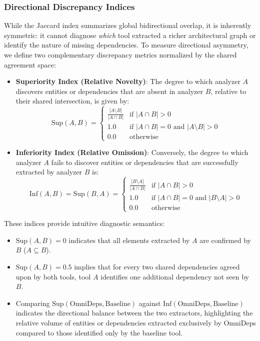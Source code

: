 \subsubsection{Directional Discrepancy Indices}
\label{subsec:discrepancy_indices}

While the Jaccard index summarizes global bidirectional overlap, it
is inherently symmetric: it cannot diagnose \textit{which} tool
extracted a richer architectural graph or identify the nature of
missing dependencies. To measure directional asymmetry, we define two
complementary discrepancy metrics normalized by the shared agreement space:

\begin{itemize}
  \item \textbf{Superiority Index (Relative Novelty)}:
    The degree to which analyzer $A$ discovers entities or dependencies
    that are absent in analyzer $B$, relative to their shared
    intersection, is given by:
    \begin{equation}
      \text{Sup}(A, B) =
      \begin{cases}
        \frac{|A \setminus B|}{|A \cap B|} & \text{if } |A \cap B| > 0 \\
        1.0 & \text{if } |A \cap B| = 0 \text{ and } |A \setminus B| > 0 \\
        0.0 & \text{otherwise}
      \end{cases}
    \end{equation}
  \item \textbf{Inferiority Index (Relative Omission)}:
    Conversely, the degree to which analyzer $A$ fails to discover
    entities or dependencies that are successfully extracted by analyzer $B$ is:
    \begin{equation}
      \text{Inf}(A, B) = \text{Sup}(B, A) =
      \begin{cases}
        \frac{|B \setminus A|}{|A \cap B|} & \text{if } |A \cap B| > 0 \\
        1.0 & \text{if } |A \cap B| = 0 \text{ and } |B \setminus A| > 0 \\
        0.0 & \text{otherwise}
      \end{cases}
    \end{equation}
\end{itemize}

\noindent
These indices provide intuitive diagnostic semantics:
\begin{itemize}
  \item $\text{Sup}(A, B) = 0$ indicates that all elements extracted
    by $A$ are confirmed by $B$ ($A \subseteq B$).
  \item $\text{Sup}(A, B) = 0.5$ implies that for every two shared
    dependencies agreed upon by both tools, tool $A$ identifies one
    additional dependency not seen by $B$.
  \item Comparing $\text{Sup}(\text{OmniDeps}, \text{Baseline})$
    against $\text{Inf}(\text{OmniDeps}, \text{Baseline})$
    indicates the directional balance between the two extractors,
    highlighting the relative volume of entities or dependencies
    extracted exclusively by OmniDeps compared to those identified
    only by the baseline tool.
\end{itemize}

